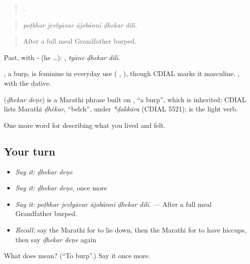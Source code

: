 \begin{quote}
    .
\end{quote}

\begin{quote}
\emph{poṭbhar jevlyāvar ājobānnī ḍhekar dilī.}
\end{quote}

\begin{quote}
After a full meal Grandfather burped.
\end{quote}

Past, with - (he …):   , \emph{tyāne ḍhekar dilī}.

, a burp, is feminine in everyday use ( ,  ), though CDIAL marks it masculine.  , with the dative.

\begin{cousinweb}
\textbf{ } (\emph{ḍhekar deṇe}) is a Marathi phrase built on , \textquotedblleft{}a burp\textquotedblright{}, which is inherited: CDIAL lists Marathi \emph{ḍhẽkar}, \textquotedblleft{}belch\textquotedblright{}, under \emph{*ḍakkāra} (CDIAL 5521);  is the light verb.
\end{cousinweb}

\begin{grammarlens}[title={What you've built}]
One more word for describing what you lived and felt.
\end{grammarlens}

\subsection*{Your turn}
\begin{itemize}
\raggedright
  \item \emph{Say it:} \emph{ḍhekar deṇe}
  \item \emph{Say it:} \emph{ḍhekar deṇe}, once more
  \item \emph{Say it:} \emph{poṭbhar jevlyāvar ājobānnī ḍhekar dilī.} — After a full meal Grandfather burped.
  \item \emph{Recall:} say the Marathi for to lie down, then the Marathi for to have hiccups, then say \emph{ḍhekar deṇe} again
\end{itemize}

\begin{tcolorbox}[breakable,colback=teal!4,colframe=teal!35!black,title={Before you move on}]
What does   mean? (\textquotedblleft{}To burp\textquotedblright{}.) Say it once more.
\end{tcolorbox}
